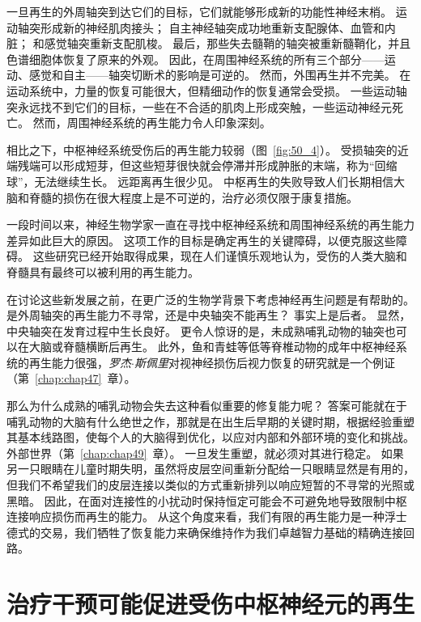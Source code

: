 一旦再生的外周轴突到达它们的目标，它们就能够形成新的功能性神经末梢。
运动轴突形成新的神经肌肉接头；
自主神经轴突成功地重新支配腺体、血管和内脏；
和感觉轴突重新支配肌梭。
最后，那些失去髓鞘的轴突被重新髓鞘化，并且色谱细胞体恢复了原来的外观。
因此，在周围神经系统的所有三个部分——运动、感觉和自主——轴突切断术的影响是可逆的。
然而，外围再生并不完美。
在运动系统中，力量的恢复可能很大，但精细动作的恢复通常会受损。
一些运动轴突永远找不到它们的目标，一些在不合适的肌肉上形成突触，一些运动神经元死亡。
然而，周围神经系统的再生能力令人印象深刻。


相比之下，中枢神经系统受伤后的再生能力较弱（图~\ref{fig:50_4}）。
受损轴突的近端残端可以形成短芽，但这些短芽很快就会停滞并形成肿胀的末端，称为“回缩球”，无法继续生长。
远距离再生很少见。
中枢再生的失败导致人们长期相信大脑和脊髓的损伤在很大程度上是不可逆的，治疗必须仅限于康复措施。


一段时间以来，神经生物学家一直在寻找中枢神经系统和周围神经系统的再生能力差异如此巨大的原因。
这项工作的目标是确定再生的关键障碍，以便克服这些障碍。
这些研究已经开始取得成果，现在人们谨慎乐观地认为，受伤的人类大脑和脊髓具有最终可以被利用的再生能力。


在讨论这些新发展之前，在更广泛的生物学背景下考虑神经再生问题是有帮助的。
是外周轴突的再生能力不寻常，还是中央轴突不能再生？ 
事实上是后者。
显然，中央轴突在发育过程中生长良好。
更令人惊讶的是，未成熟哺乳动物的轴突也可以在大脑或脊髓横断后再生。
此外，鱼和青蛙等低等脊椎动物的成年中枢神经系统的再生能力很强，\textit{罗杰$\cdot$斯佩里}对视神经损伤后视力恢复的研究就是一个例证（第~\ref{chap:chap47}~章）。


那么为什么成熟的哺乳动物会失去这种看似重要的修复能力呢？
答案可能就在于哺乳动物的大脑有什么绝世之作，那就是在出生后早期的关键时期，根据经验重塑其基本线路图，使每个人的大脑得到优化，以应对内部和外部环境的变化和挑战。
外部世界（第~\ref{chap:chap49}~章）。
一旦发生重塑，就必须对其进行稳定。
如果另一只眼睛在儿童时期失明，虽然将皮层空间重新分配给一只眼睛显然是有用的，但我们不希望我们的皮层连接以类似的方式重新排列以响应短暂的不寻常的光照或黑暗。
因此，在面对连接性的小扰动时保持恒定可能会不可避免地导致限制中枢连接响应损伤而再生的能力。
从这个角度来看，我们有限的再生能力是一种浮士德式的交易，我们牺牲了恢复能力来确保维持作为我们卓越智力基础的精确连接回路。



\section{治疗干预可能促进受伤中枢神经元的再生}

